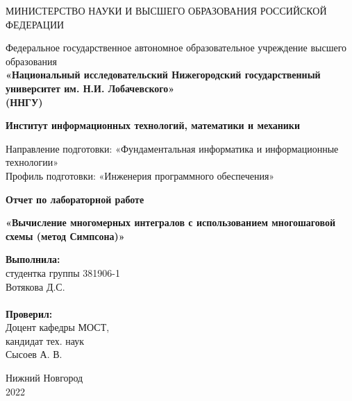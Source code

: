 \documentclass{report}
\begin{document}
\begin{titlepage}

\begin{center}
МИНИСТЕРСТВО НАУКИ И ВЫСШЕГО ОБРАЗОВАНИЯ РОССИЙСКОЙ ФЕДЕРАЦИИ 
\end{center}

\begin{center}
Федеральное государственное автономное образовательное учреждение высшего образования \\
\textbf{«Национальный исследовательский 
Нижегородский государственный университет им. Н.И. Лобачевского» \\
(ННГУ)}
\end{center}
\begin{center}
\textbf{Институт информационных технологий, математики и механики}
\end{center}
\begin{center}
Направление подготовки: «Фундаментальная информатика и информационные технологии»\\
Профиль подготовки: «Инженерия программного обеспечения»
\end{center}

\begin{center}
\textbf{Отчет по лабораторной работе} \\
\end{center}
\begin{center}
\textbf{«Вычисление многомерных интегралов с использованием многошаговой схемы (метод Симпсона)»} \\
\end{center}

\vspace{2em}

\newbox{\lbox}
\newlength{\maxl}
\setlength{\maxl}{\wd\lbox}
\hfill\parbox{7cm}{
\hspace*{5cm}\hspace*{-5cm}\textbf{Выполнила:} \\ студентка группы 381906-1 \\ Вотякова Д.С.\\
\\
\hspace*{5cm}\hspace*{-5cm}\textbf{Проверил:}\\ Доцент кафедры МОСТ, \\ кандидат тех. наук \\ Сысоев А. В.\\
}
\vspace{\fill}

\begin{center} Нижний Новгород \\ 2022 \end{center}

\end{titlepage}
\end{document}
